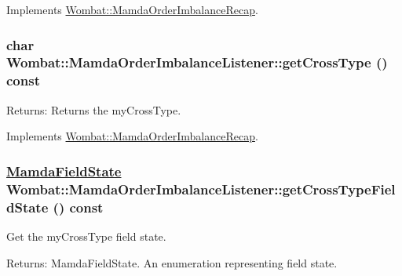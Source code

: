 Implements \hyperlink{classWombat_1_1MamdaOrderImbalanceRecap_00676cadceeeccb79a6e27f2001580ca}{Wombat::Mamda\-Order\-Imbalance\-Recap}.\hypertarget{classWombat_1_1MamdaOrderImbalanceListener_068ff249e302d5490189e747622fae22}{
\subsubsection[getCrossType]{\setlength{\rightskip}{0pt plus 5cm}char Wombat::Mamda\-Order\-Imbalance\-Listener::get\-Cross\-Type () const}}
\label{classWombat_1_1MamdaOrderImbalanceListener_068ff249e302d5490189e747622fae22}


\begin{Desc}
\item[Returns:]Returns the my\-Cross\-Type. \end{Desc}


Implements \hyperlink{classWombat_1_1MamdaOrderImbalanceRecap_9ecbfc392c96d8fadb6fda3a0b976de1}{Wombat::Mamda\-Order\-Imbalance\-Recap}.\hypertarget{classWombat_1_1MamdaOrderImbalanceListener_ad35a45f28ab61abc265d15c76a26c37}{
\subsubsection[getCrossTypeFieldState]{\setlength{\rightskip}{0pt plus 5cm}\hyperlink{namespaceWombat_93aac974f2ab713554fd12a1fa3b7d2a}{Mamda\-Field\-State} Wombat::Mamda\-Order\-Imbalance\-Listener::get\-Cross\-Type\-Field\-State () const}}
\label{classWombat_1_1MamdaOrderImbalanceListener_ad35a45f28ab61abc265d15c76a26c37}


Get the my\-Cross\-Type field state. 

\begin{Desc}
\item[Returns:]Mamda\-Field\-State. An enumeration representing field state. \end{Desc}



